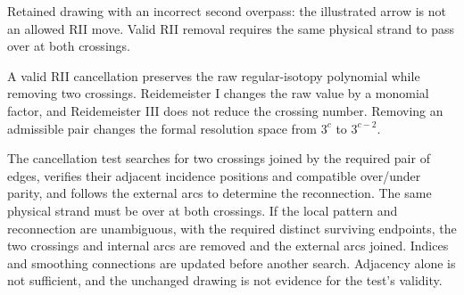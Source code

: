 \documentclass[10pt,twocolumn]{article}
\begin{document}
\begin{center}

\small
Retained drawing with an incorrect second overpass: the illustrated arrow is not an allowed RII move. Valid RII removal requires the same physical strand to pass over at both crossings.
\end{center}

A valid RII cancellation preserves the raw regular-isotopy polynomial while removing two crossings. Reidemeister I changes the raw value by a monomial factor, and Reidemeister III does not reduce the crossing number. Removing an admissible pair changes the formal resolution space from $3^c$ to $3^{c-2}$.

The cancellation test searches for two crossings joined by the required pair of edges, verifies their adjacent incidence positions and compatible over/under parity, and follows the external arcs to determine the reconnection. The same physical strand must be over at both crossings. If the local pattern and reconnection are unambiguous, with the required distinct surviving endpoints, the two crossings and internal arcs are removed and the external arcs joined. Indices and smoothing connections are updated before another search. Adjacency alone is not sufficient, and the unchanged drawing is not evidence for the test's validity.
\end{document}
